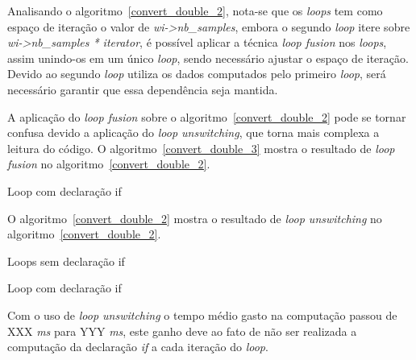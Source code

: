 Analisando o algoritmo~\ref{convert_double_2}, nota-se que os 
\textit{loops} tem como
espaço de iteração o valor de \textit{wi->nb\_samples}, embora o segundo
\textit{loop} itere sobre \textit{wi->nb\_samples * iterator},  é possível aplicar
a técnica \textit{loop fusion} nos \textit{loops}, assim unindo-os em um
único \textit{loop}, sendo necessário ajustar o espaço de iteração. 
Devido ao
segundo \textit{loop} utiliza os dados computados pelo primeiro \textit{loop},
será necessário garantir que essa dependência seja mantida.

A aplicação do \textit{loop fusion} sobre o
algoritmo~\ref{convert_double_2} pode se tornar confusa devido a aplicação do
\textit{loop unswitching}, que torna mais complexa a leitura do código. O
algoritmo~\ref{convert_double_3} mostra o 
resultado de \textit{loop fusion} no algoritmo~\ref{convert_double_2}. 


\begin{algorithm}
\caption{Loop com declaração if }
\label{convert_double_1}

\end{algorithm}

O algoritmo~\ref{convert_double_2} mostra o resultado de \textit{loop
unswitching} no algoritmo~\ref{convert_double_2}.

\begin{algorithm}
\caption{Loops sem declaração if}
\label{convert_double_2}

\end{algorithm}

\begin{algorithm}
\caption{Loop com declaração if }
\label{convert_double_3}

\end{algorithm}



Com o uso de \textit{loop unswitching} o tempo médio gasto na computação passou
de XXX \textit{ms} para YYY \textit{ms}, este ganho deve ao fato de não ser
realizada a computação da declaração \textit{if} a cada iteração do
\textit{loop}.




%


%
